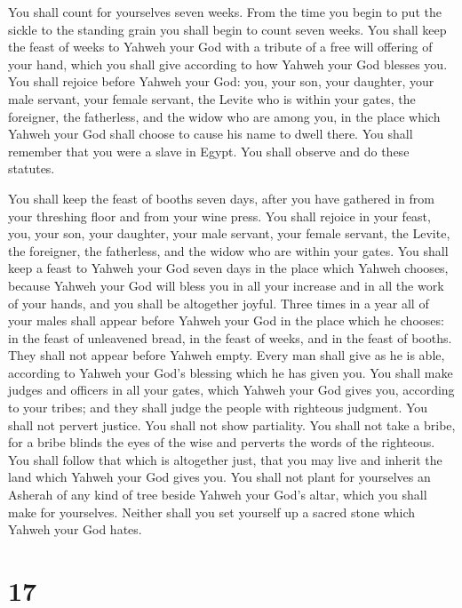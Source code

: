  You shall count for yourselves seven weeks. From the time
you begin to put the sickle to the standing grain you shall begin to
count seven weeks.  You shall keep the feast of weeks to
Yahweh your God with a tribute of a free will offering of your hand,
which you shall give according to how Yahweh your God blesses you.
 You shall rejoice before Yahweh your God: you, your son,
your daughter, your male servant, your female servant, the Levite who is
within your gates, the foreigner, the fatherless, and the widow who are
among you, in the place which Yahweh your God shall choose to cause his
name to dwell there.  You shall remember that you were a
slave in Egypt. You shall observe and do these statutes.

 You shall keep the feast of booths seven days, after you
have gathered in from your threshing floor and from your wine press.
 You shall rejoice in your feast, you, your son, your
daughter, your male servant, your female servant, the Levite, the
foreigner, the fatherless, and the widow who are within your gates.
 You shall keep a feast to Yahweh your God seven days in
the place which Yahweh chooses, because Yahweh your God will bless you
in all your increase and in all the work of your hands, and you shall be
altogether joyful.  Three times in a year all of your males
shall appear before Yahweh your God in the place which he chooses: in
the feast of unleavened bread, in the feast of weeks, and in the feast
of booths. They shall not appear before Yahweh empty. 
Every man shall give as he is able, according to Yahweh your God's
blessing which he has given you.  You shall make judges and
officers in all your gates, which Yahweh your God gives you, according
to your tribes; and they shall judge the people with righteous judgment.
 You shall not pervert justice. You shall not show
partiality. You shall not take a bribe, for a bribe blinds the eyes of
the wise and perverts the words of the righteous.  You
shall follow that which is altogether just, that you may live and
inherit the land which Yahweh your God gives you.  You
shall not plant for yourselves an Asherah of any kind of tree beside
Yahweh your God's altar, which you shall make for yourselves.
 Neither shall you set yourself up a sacred stone which
Yahweh your God hates.

\hypertarget{section-16}{%
\section{17}\label{section-16}}


